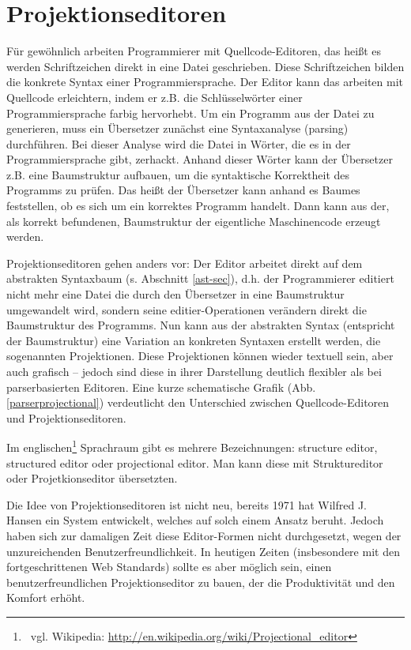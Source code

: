  
\section{Projektionseditoren}\label{Projektionseditoren-sec}
 
Für gewöhnlich arbeiten Programmierer mit Quellcode-Editoren, das heißt es werden Schriftzeichen direkt in eine Datei geschrieben. Diese Schriftzeichen bilden die konkrete Syntax einer Programmiersprache. Der Editor kann das arbeiten mit Quellcode erleichtern, indem er z.B. die Schlüsselwörter einer Programmiersprache farbig hervorhebt. Um ein Programm aus der Datei zu generieren, muss ein Übersetzer zunächst eine Syntaxanalyse (parsing) durchführen. Bei dieser Analyse wird die Datei in Wörter, die es in der Programmiersprache gibt, zerhackt. Anhand dieser Wörter kann der Übersetzer z.B. eine Baumstruktur aufbauen, um die syntaktische Korrektheit des Programms zu prüfen. Das heißt der Übersetzer kann anhand es Baumes feststellen, ob es sich um ein korrektes Programm handelt. Dann kann aus der, als korrekt befundenen, Baumstruktur der eigentliche Maschinencode erzeugt werden.

 
Projektionseditoren gehen anders vor: Der Editor arbeitet direkt auf dem abstrakten Syntaxbaum (s. Abschnitt \ref{ast-sec}), d.h. der Programmierer editiert nicht mehr eine Datei die durch den Übersetzer in eine Baumstruktur umgewandelt wird, sondern seine editier-Operationen verändern direkt die Baumstruktur des Programms. \citep[S.~68]{Voelter} Nun kann aus der abstrakten Syntax (entspricht der Baumstruktur) eine Variation an konkreten Syntaxen erstellt werden, die sogenannten Projektionen. Diese Projektionen können wieder textuell sein, aber auch grafisch -- jedoch sind diese in ihrer Darstellung deutlich flexibler als bei parserbasierten Editoren. Eine kurze schematische Grafik (Abb. \ref{parserprojectional}) verdeutlicht den Unterschied zwischen Quellcode-Editoren und Projektionseditoren.

 
Im englischen\footnote{~vgl. Wikipedia: \url{http://en.wikipedia.org/wiki/Projectional\_editor}} Sprachraum gibt es mehrere Bezeichnungen: structure editor, structured editor oder projectional editor. Man kann diese mit Struktureditor oder Projetkionseditor übersetzten.

 
Die Idee von Projektionseditoren ist nicht neu, bereits 1971 hat Wilfred J. Hansen ein System entwickelt, welches auf solch einem Ansatz beruht. Jedoch haben sich zur damaligen Zeit diese Editor-Formen nicht durchgesetzt, wegen der unzureichenden Benutzerfreundlichkeit. \citep[S.~91]{Gomolka} In heutigen Zeiten (insbesondere mit den fortgeschrittenen Web Standards) sollte es aber möglich sein, einen benutzerfreundlichen Projektionseditor zu bauen, der die Produktivität und den Komfort erhöht.

